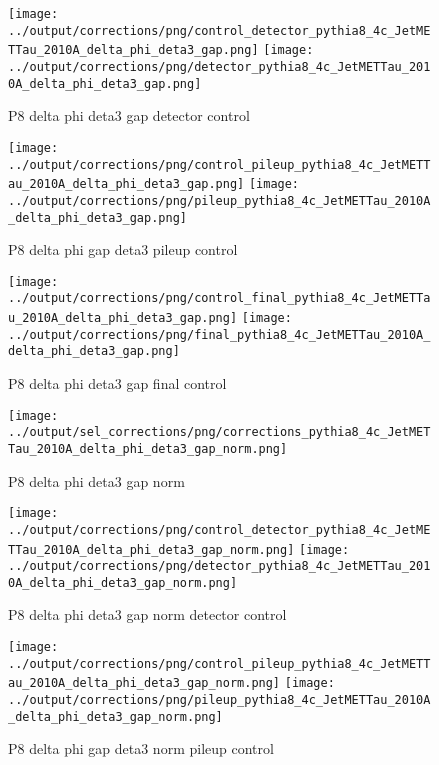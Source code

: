 \documentclass[11pt]{book}
\begin{document}
\begin{figure}[ht]
\centering
\texttt{[image: ../output/corrections/png/control\_detector\_pythia8\_4c\_JetMETTau\_2010A\_delta\_phi\_deta3\_gap.png]}
\texttt{[image: ../output/corrections/png/detector\_pythia8\_4c\_JetMETTau\_2010A\_delta\_phi\_deta3\_gap.png]}
\caption{P8 delta phi deta3 gap detector control}
\label{fig:p8_JetMETTau_2010A_delta_phi_deta3_gap_detector_control}
\end{figure}

\begin{figure}[ht]
\centering
\texttt{[image: ../output/corrections/png/control\_pileup\_pythia8\_4c\_JetMETTau\_2010A\_delta\_phi\_deta3\_gap.png]}
\texttt{[image: ../output/corrections/png/pileup\_pythia8\_4c\_JetMETTau\_2010A\_delta\_phi\_deta3\_gap.png]}
\caption{P8 delta phi gap deta3 pileup control}
\label{fig:p8_JetMETTau_2010A_delta_phi_deta3_gap_pileup_control}
\end{figure}


\begin{figure}[ht]
\centering
\texttt{[image: ../output/corrections/png/control\_final\_pythia8\_4c\_JetMETTau\_2010A\_delta\_phi\_deta3\_gap.png]}
\texttt{[image: ../output/corrections/png/final\_pythia8\_4c\_JetMETTau\_2010A\_delta\_phi\_deta3\_gap.png]}
\caption{P8 delta phi deta3 gap final control}
\label{fig:p8_JetMETTau_2010A_delta_phi_deta3_gap_final_control}
\end{figure}


\begin{figure}[ht]
\centering
\texttt{[image: ../output/sel\_corrections/png/corrections\_pythia8\_4c\_JetMETTau\_2010A\_delta\_phi\_deta3\_gap\_norm.png]}
\caption{P8 delta phi deta3 gap norm}
\label{fig:p8_JetMETTau_2010A_delta_phi_deta3_gap_norm}
\end{figure}


\begin{figure}[ht]
\centering
\texttt{[image: ../output/corrections/png/control\_detector\_pythia8\_4c\_JetMETTau\_2010A\_delta\_phi\_deta3\_gap\_norm.png]}
\texttt{[image: ../output/corrections/png/detector\_pythia8\_4c\_JetMETTau\_2010A\_delta\_phi\_deta3\_gap\_norm.png]}
\caption{P8 delta phi deta3 gap norm detector control}
\label{fig:p8_JetMETTau_2010A_delta_phi_deta3_gap_norm_detector_control}
\end{figure}

\begin{figure}[ht]
\centering
\texttt{[image: ../output/corrections/png/control\_pileup\_pythia8\_4c\_JetMETTau\_2010A\_delta\_phi\_deta3\_gap\_norm.png]}
\texttt{[image: ../output/corrections/png/pileup\_pythia8\_4c\_JetMETTau\_2010A\_delta\_phi\_deta3\_gap\_norm.png]}
\caption{P8 delta phi gap deta3 norm pileup control}
\label{fig:p8_JetMETTau_2010A_delta_phi_deta3_gap_norm_pileup_control}
\end{figure}
\end{document}
